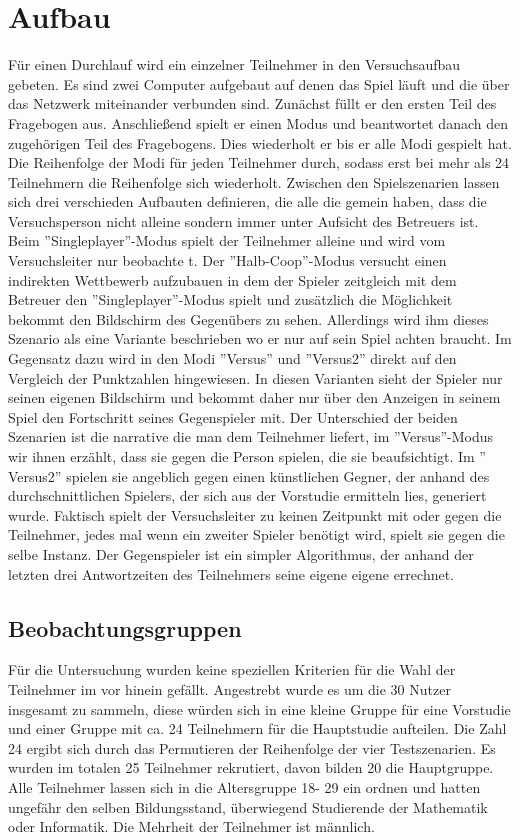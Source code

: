 \section{Aufbau}
Für einen Durchlauf wird ein einzelner Teilnehmer in den Versuchsaufbau gebeten. Es sind zwei Computer aufgebaut auf denen das Spiel läuft und die über das Netzwerk miteinander verbunden sind. Zunächst füllt er den ersten Teil des Fragebogen aus. Anschließend spielt er einen Modus und beantwortet danach den zugehörigen Teil des Fragebogens. Dies wiederholt er bis er alle Modi gespielt hat. Die Reihenfolge der Modi für jeden Teilnehmer durch, sodass erst bei mehr als 24 Teilnehmern die Reihenfolge sich wiederholt. Zwischen den Spielszenarien lassen sich drei verschieden Aufbauten definieren, die alle die gemein haben, dass die Versuchsperson nicht alleine sondern immer unter Aufsicht des Betreuers ist. Beim ''Singleplayer''-Modus spielt der  Teilnehmer alleine und wird vom Versuchsleiter nur beobachte t. Der ''Halb-Coop''-Modus  versucht einen indirekten Wettbewerb aufzubauen in dem der Spieler zeitgleich mit dem Betreuer den ''Singleplayer''-Modus spielt und zusätzlich die Möglichkeit bekommt den Bildschirm des Gegenübers zu sehen. Allerdings wird ihm dieses Szenario als eine Variante beschrieben wo er nur auf sein Spiel achten braucht. Im Gegensatz dazu wird in den Modi ''Versus'' und ''Versus2'' direkt auf den Vergleich der Punktzahlen hingewiesen. In diesen Varianten sieht der Spieler nur seinen eigenen Bildschirm und bekommt daher nur über den Anzeigen in seinem Spiel den Fortschritt seines Gegenspieler mit. Der Unterschied der beiden Szenarien ist die narrative die man dem Teilnehmer liefert, im ''Versus''-Modus wir ihnen erzählt, dass sie gegen die Person spielen, die sie beaufsichtigt. Im '' Versus2'' spielen sie angeblich gegen einen künstlichen  Gegner, der anhand des durchschnittlichen Spielers, der sich aus der Vorstudie ermitteln lies, generiert wurde. Faktisch spielt der Versuchsleiter zu keinen Zeitpunkt mit oder gegen die Teilnehmer, jedes mal wenn ein zweiter Spieler benötigt wird, spielt sie gegen die selbe Instanz. Der Gegenspieler ist ein simpler Algorithmus, der anhand der letzten drei Antwortzeiten des Teilnehmers seine eigene eigene errechnet.
\subsection{Beobachtungsgruppen}
Für die Untersuchung wurden keine speziellen Kriterien für die Wahl der Teilnehmer im vor hinein gefällt. Angestrebt wurde es um die 30 Nutzer insgesamt zu sammeln, diese würden sich in eine kleine Gruppe für eine Vorstudie und einer Gruppe mit ca. 24 Teilnehmern für die Hauptstudie aufteilen. Die Zahl 24 ergibt sich durch das Permutieren der Reihenfolge der vier Testszenarien. Es wurden im totalen 25 Teilnehmer rekrutiert, davon bilden 20 die Hauptgruppe. Alle Teilnehmer lassen sich in die Altersgruppe 18- 29 ein ordnen und hatten ungefähr den selben Bildungsstand, überwiegend Studierende der Mathematik oder Informatik. Die Mehrheit der Teilnehmer ist männlich.

